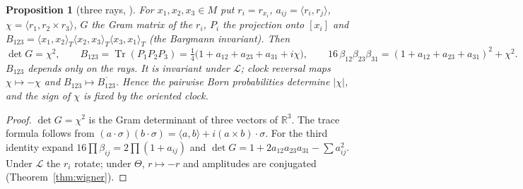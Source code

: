 \documentclass[aps,pra,onecolumn,superscriptaddress,nofootinbib,10pt]{revtex4-2}
\newtheorem{proposition}[theorem]{Proposition}
\theoremstyle{definition}
\theoremstyle{remark}
\newcommand{\R}{\mathbb{R}}
\newcommand{\cL}{\mathcal{L}}
\newcommand{\tr}{\operatorname{Tr}}
\newcommand{\ip}[2]{\langle #1,#2\rangle}
\begin{document}
\begin{proposition}[three rays, {\cite[Lemma~6.2]{CRQO}}]\label{prop:threerays}
For $x_1,x_2,x_3\in M$ put $r_i=r_{x_i}$, $a_{ij}=\ip{r_i}{r_j}$, $\chi=\ip{r_1}{r_2\times r_3}$, $G$ the
Gram matrix of the $r_i$, $P_i$ the projection onto $[x_i]$ and
$B_{123}=\ip{x_1}{x_2}_T\ip{x_2}{x_3}_T\ip{x_3}{x_1}_T$ (the Bargmann invariant).  Then
\[
\det G=\chi^2,\qquad B_{123}=\tr(P_1P_2P_3)=\tfrac14\bigl(1+a_{12}+a_{23}+a_{31}+i\chi\bigr),\qquad
16\,\beta_{12}\beta_{23}\beta_{31}=(1+a_{12}+a_{23}+a_{31})^2+\chi^2 .
\]
$B_{123}$ depends only on the rays.  It is invariant under $\cL$; clock reversal maps $\chi\mapsto-\chi$
and $B_{123}\mapsto\overline{B_{123}}$.  Hence the pairwise Born probabilities determine $\lvert\chi\rvert$,
and the sign of $\chi$ is fixed by the oriented clock.
\end{proposition}
\begin{proof}
$\det G=\chi^2$ is the Gram determinant of three vectors of $\R^3$.  The trace formula follows from
$(a\cdot\sigma)(b\cdot\sigma)=\ip{a}{b}+i(a\times b)\cdot\sigma$.  For the third identity expand
$16\prod\beta_{ij}=2\prod(1+a_{ij})$ and $\det G=1+2a_{12}a_{23}a_{31}-\sum a_{ij}^2$.  Under $\cL$ the
$r_i$ rotate; under $\Theta$, $r\mapsto-r$ and amplitudes are conjugated (Theorem~\ref{thm:wigner}).
\end{proof}
\end{document}
